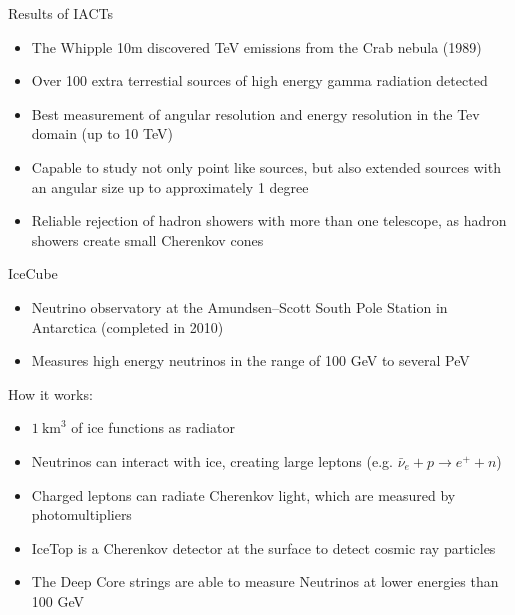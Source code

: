 \documentclass[aspectratio=1610, 10pt]{beamer}
\begin{document}
\begin{frame}{Results of IACTs}
  \begin{itemize}
    \item The Whipple 10m discovered TeV emissions from the Crab nebula (1989) %
    \medskip
    \item Over 100 extra terrestial sources of high energy gamma radiation detected \cite{iact_2}
    \medskip
    \item Best measurement of angular resolution and energy resolution in the Tev domain (up to 10 TeV)
    \medskip
    \item Capable to study not only point like sources, but also extended sources with an angular size up
    to approximately 1 degree
    \medskip
    \item  Reliable rejection of hadron showers with more than one telescope, as hadron showers create small Cherenkov cones
  \end{itemize}
\end{frame}

\begin{frame}{IceCube}
  \begin{itemize}
    \item Neutrino observatory at the Amundsen–Scott South Pole Station in Antarctica (completed in 2010)
    \medskip
    \item Measures high energy neutrinos in the range of 100 GeV to several PeV
  \end{itemize}
\vspace{0.5cm}
  How it works:
  \begin{itemize}
    \item $1 \: \mathrm{km}^3$ of ice functions as radiator
    \medskip
    \item Neutrinos can interact with ice, creating large leptons (e.g. $\bar{\nu}_e + p \rightarrow e^{+} + n$)
    \medskip
    \item Charged leptons can radiate Cherenkov light, which are measured by photomultipliers
    \medskip
    \item IceTop is a Cherenkov detector at the surface to detect cosmic ray particles
    \medskip
    \item The Deep Core strings are able to measure Neutrinos at lower energies than 100 GeV
  \end{itemize}
\end{frame}
\end{document}
